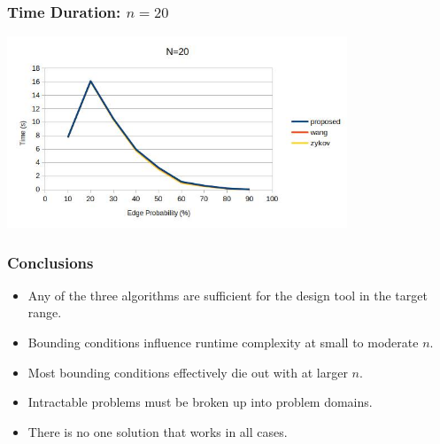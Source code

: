 \documentclass{beamer}
\begin{document}
\begin{frame}
  \frametitle{Time Duration: \(n=20\)}
  \begin{center}
    \includegraphics[width=4in]{../final/duration_20}
  \end{center}
\end{frame}

\begin{frame}
  \frametitle{Conclusions}
  \begin{itemize}
  \item Any of the three algorithms are sufficient for the design tool in the target range.
  \item Bounding conditions influence runtime complexity at small to moderate \(n\).
  \item Most bounding conditions effectively die out with at larger \(n\).
  \item Intractable problems must be broken up into problem domains.
  \item There is no one solution that works in all cases.
  \end{itemize}
\end{frame}
\end{document}
